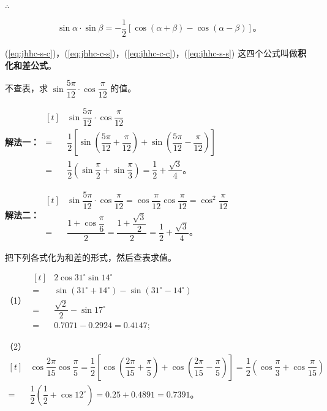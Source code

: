 \jiange$\therefore$
\begin{minipage}{0.9\textwidth}
\begin{gather}
    \sin\alpha \cdot \sin\beta = -\dfrac{1}{2} [\cos(\alpha + \beta) - \cos(\alpha - \beta)] \text{。} \tag{$4$}\label{eq:jhhc-s-s}
\end{gather}
\end{minipage}\jiange

(\ref{eq:jhhc-s-c})，(\ref{eq:jhhc-c-s})，(\ref{eq:jhhc-c-c})，(\ref{eq:jhhc-s-s}) 这四个公式叫做\textbf{积化和差公式}。

\jiange\liti 不查表，求 $\sin\dfrac{5\pi}{12} \cdot \cos\dfrac{\pi}{12}$ 的值。\jiange

\textbf{解法一：} $\begin{aligned}[t]
    & \sin\dfrac{5\pi}{12} \cdot \cos\dfrac{\pi}{12} \\
    = & \dfrac{1}{2}\left[\sin\left( \dfrac{5\pi}{12} + \dfrac{\pi}{12} \right) + \sin\left( \dfrac{5\pi}{12} - \dfrac{\pi}{12} \right)\right] \\
    = & \dfrac{1}{2}\left( \sin\dfrac{\pi}{2} + \sin\dfrac{\pi}{3} \right) = \dfrac{1}{2} + \dfrac{\sqrt{3}}{4} \text{。}
\end{aligned}$ \jiange

\textbf{解法二：} $\begin{aligned}[t]
    & \sin\dfrac{5\pi}{12} \cdot \cos\dfrac{\pi}{12} = \cos\dfrac{\pi}{12} \cos\dfrac{\pi}{12} = \cos^2\dfrac{\pi}{12} \\
    = & \dfrac{1 + \cos\dfrac{\pi}{6}}{2} = \dfrac{1 + \dfrac{\sqrt{3}}{2}}{2} = \dfrac{1}{2} + \dfrac{\sqrt{3}}{4} \text{。}
\end{aligned}$ \jiange

\liti 把下列各式化为和差的形式，然后查表求值。\jiange

\jiange

\jie （1） $\begin{aligned}[t]
    & 2\cos31^\circ \sin14^\circ \\
    = & \sin(31^\circ + 14^\circ) - \sin(31^\circ - 14^\circ) \\
    = & \dfrac{\sqrt{2}}{2} - \sin 17^\circ \\
    = & 0.7071 - 0.2924 = 0.4147;
\end{aligned}$ \jiange

（2） $\begin{aligned}[t]
    & \cos\dfrac{2\pi}{15} \cos\dfrac{\pi}{5}
    = \dfrac{1}{2} \left[ \cos\left( \dfrac{2\pi}{15} + \dfrac{\pi}{5} \right) +  \cos\left( \dfrac{2\pi}{15} - \dfrac{\pi}{5} \right) \right]
    = \dfrac{1}{2} \left( \cos\dfrac{\pi}{3} + \cos\dfrac{\pi}{15} \right) \\
    = & \dfrac{1}{2} \left( \dfrac{1}{2} + \cos12^\circ \right) = 0.25 + 0.4891 = 0.7391 \text{。}
\end{aligned}$ \jiange

